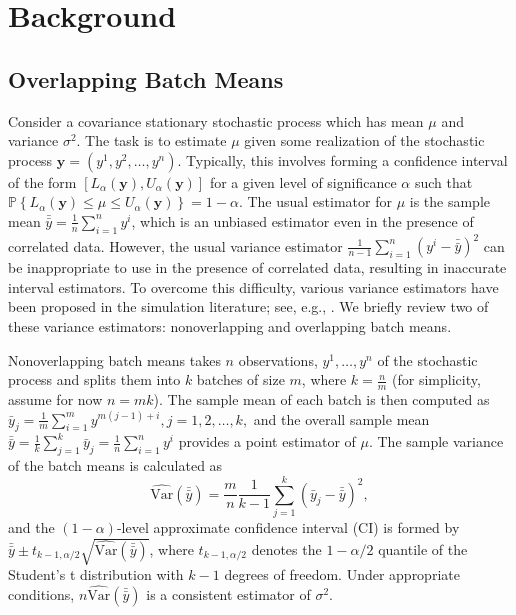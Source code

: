 \documentclass[11pt]{article}
\newcommand{\p}[1]{\mathbb{P} \left\{ #1 \right\}}
\newcommand{\varhat}{\widehat{\mathrm{Var}}}
\newcommand{\y}{\mathbf{y}}
\newcommand{\yb}{\bar{y}}
\newcommand{\ybb}{\bar{\yb}}
\begin{document}
\section{Background}
\label{sec:background}

\subsection{Overlapping Batch Means} \label{ssec:obm}
Consider a covariance stationary stochastic process which has mean $\mu$ and variance $\sigma^2$.  
The task is to estimate $\mu$ given some realization of the stochastic process $\y = (y^1, y^2, \dots, y^n)$.  
Typically, this involves forming a confidence interval of the form $[L_\alpha(\y), U_\alpha(\y)]$ for a given level of significance $\alpha$ such that $\p{L_\alpha(\y) \leq \mu \leq U_\alpha(\y)} = 1 - \alpha$.  
The usual estimator for $\mu$ is the sample mean $\ybb = \frac{1}{n} \sum_{i=1}^n y^i$, which is an unbiased estimator even in the presence of correlated data.  
However, the usual variance estimator $\frac{1}{n-1} \sum_{i=1}^n (y^i - \ybb)^2$ can be inappropriate to use in the presence of correlated data, resulting in inaccurate interval estimators.  
To overcome this difficulty, various variance estimators have been proposed in the simulation literature; see, e.g., \cite{law_07}.  
We briefly review two of these variance estimators: nonoverlapping and overlapping batch means.

Nonoverlapping batch means takes $n$ observations, $y^1, \dots, y^n$ of the stochastic process and splits them into $k$ batches of size $m$, where $k = \frac{n}{m}$ (for simplicity, assume for now $n = mk$).  
The sample mean of each batch is then computed as
$
	\yb_j = \frac{1}{m} \sum_{i=1}^{m} y^{m(j-1)+i}, j = 1,2, \dots, k,
$
and the overall sample mean $\ybb = \frac{1}{k} \sum_{j=1}^k \yb_j = \frac{1}{n} \sum_{i=1}^n y^i$ provides a point estimator of $\mu$.  
The sample variance of the batch means is calculated as
\begin{equation} \label{eq:var}
	\varhat(\ybb) = \frac{m}{n}\frac{1}{k-1} \sum_{j=1}^k \left( \yb_j - \ybb \right)^2,
\end{equation}
and the $(1-\alpha)$-level approximate confidence interval (CI) is formed by $\ybb \pm t_{k-1,\alpha/2} \sqrt{\varhat(\ybb)}$, where $t_{k-1,\alpha/2}$ denotes the $1-\alpha/2$ quantile of the Student's t distribution with $k-1$ degrees of freedom.  
Under appropriate conditions, $n\varhat(\ybb)$ is a consistent estimator of $\sigma^2$.
\end{document}
